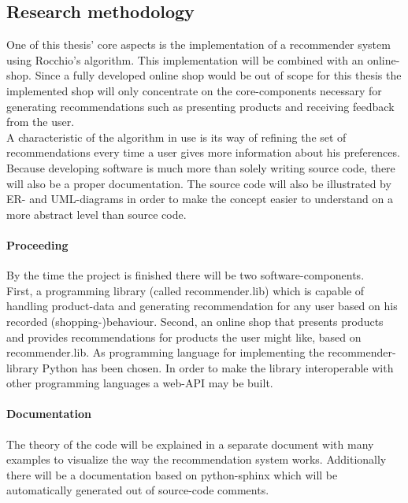 \subsection{Research methodology}
One of this thesis' core aspects is the implementation of a recommender system using Rocchio's algorithm.
This implementation will be combined with an online-shop.
Since a fully developed online shop would be out of scope for this thesis the implemented shop will only concentrate on the core-components necessary for generating recommendations such as presenting products and receiving feedback from the user.
\\
A characteristic of the algorithm in use is its way of refining the set of recommendations every time a user gives more information about his preferences.\citep[p. 92]{lops:2011}
\\
Because developing software is much more than solely writing source code, there will also be a proper documentation.
The source code will also be illustrated by ER- and UML-diagrams in order to make the concept easier to understand on a more abstract level than source code.

\paragraph{Proceeding}
By the time the project is finished there will be two software-components.
\\
First, a programming library (called recommender.lib) which is capable of handling product-data and generating recommendation for any user based on his recorded (shopping-)behaviour.
Second, an online shop that presents products and provides recommendations for products the user might like, based on recommender.lib.
As programming language for implementing the recommender-library Python has been chosen.
In order to make the library interoperable with other programming languages a web-API may be built.

\paragraph{Documentation}
The theory of the code will be explained in a separate document with many examples to visualize the way the recommendation system works.
Additionally there will be a documentation based on python-sphinx which will be automatically generated out of source-code comments.

